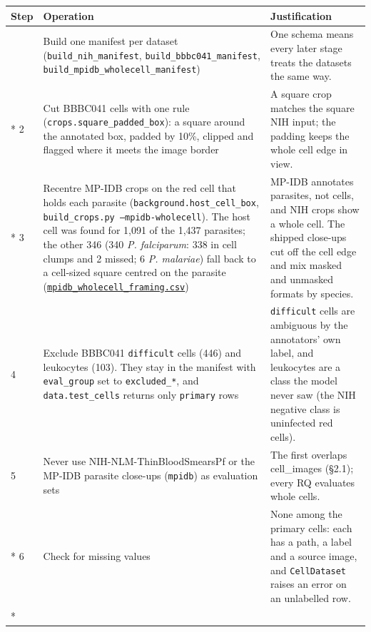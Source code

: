 \documentclass[11pt,a4paper]{article}
\begin{document}
{\small
\begin{longtable}{@{}>{\raggedright\arraybackslash\hspace{0pt}}p{25.5pt}>{\raggedright\arraybackslash\hspace{0pt}}p{185.5pt}>{\raggedright\arraybackslash\hspace{0pt}}p{113.0pt}@{}}
\toprule
Step & Operation & Justification \\
\midrule
\endhead
\bottomrule
\endfoot
\bottomrule
\endlastfoot
1 & Build one manifest per dataset (\texttt{build\_\allowbreak{}nih\_\allowbreak{}manifest}, \texttt{build\_\allowbreak{}bbbc041\_\allowbreak{}manifest}, \texttt{build\_\allowbreak{}mpidb\_\allowbreak{}wholecell\_\allowbreak{}manifest}) & One schema means every later stage treats the datasets the same way. \\*
2 & Cut BBBC041 cells with one rule (\texttt{crops.\allowbreak{}square\_\allowbreak{}padded\_\allowbreak{}box}): a square around the annotated box, padded by 10\%, clipped and flagged where it meets the image border & A square crop matches the square NIH input; the padding keeps the whole cell edge in view. \\*
3 & Recentre MP-IDB crops on the red cell that holds each parasite (\texttt{background.\allowbreak{}host\_\allowbreak{}cell\_\allowbreak{}box}, \texttt{build\_\allowbreak{}crops.\allowbreak{}py --mpidb-wholecell}). The host cell was found for 1,091 of the 1,437 parasites; the other 346 (340 \emph{P. falciparum}: 338 in cell clumps and 2 missed; 6 \emph{P. malariae}) fall back to a cell-sized square centred on the parasite (\href{https://github.com/noahtjonsk/malaria-cross-dataset/blob/main/outputs/tables/mpidb_wholecell_framing.csv}{\texttt{mpidb\_\allowbreak{}wholecell\_\allowbreak{}framing.\allowbreak{}csv}}) & MP-IDB annotates parasites, not cells, and NIH crops show a whole cell. The shipped close-ups cut off the cell edge and mix masked and unmasked formats by species. \\
4 & Exclude BBBC041 \texttt{difficult} cells (446) and leukocytes (103). They stay in the manifest with \texttt{eval\_\allowbreak{}group} set to \texttt{excluded\_\allowbreak{}*}, and \texttt{data.\allowbreak{}test\_\allowbreak{}cells} returns only \texttt{primary} rows & \texttt{difficult} cells are ambiguous by the annotators' own label, and leukocytes are a class the model never saw (the NIH negative class is uninfected red cells). \\
5 & Never use NIH-NLM-ThinBloodSmearsPf or the MP-IDB parasite close-ups (\texttt{mpidb}) as evaluation sets & The first overlaps cell\_\allowbreak{}images (\S{}2.1); every RQ evaluates whole cells. \\*
6 & Check for missing values & None among the primary cells: each has a path, a label and a source image, and \texttt{CellDataset} raises an error on an unlabelled row. \\*
\end{longtable}}
\addtocounter{table}{-1}
\end{document}
